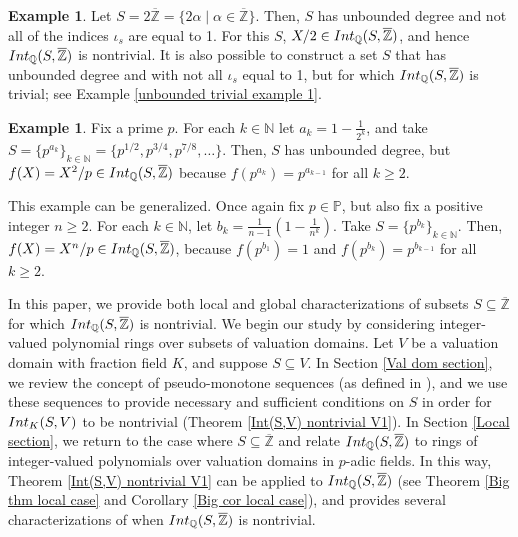 \documentclass{article}
\theoremstyle{definition}\newtheorem{Def}[equation]{Definition}
\newtheorem{Ex}[equation]{Example}
\theoremstyle{definition}\newtheorem{Ques}[equation]{Question}
\theoremstyle{definition}\newtheorem{Conj}[equation]{Conjecture}
\theoremstyle{definition}\newtheorem{Not}[equation]{Notation}
\newcommand{\N}{\mathbb{N}}
\newcommand{\Q}{\mathbb{Q}}
\newcommand{\oZ}{\overline{\Z}}
\newcommand{\Z}{\mathbb{Z}}
\newcommand{\Int}{\textnormal{Int}}
\newcommand{\IntQ}{\Int_{\Q}}
\newcommand{\PP}{\mathbb{P}}
\numberwithin{equation}{section}
\begin{document}
\begin{Ex}\label{2Z example}
Let $S = 2\oZ = \{2\alpha \mid \alpha \in \oZ\}$. Then, $S$ has unbounded degree and not all of the indices $\iota_s$ are equal to 1. For this $S$, $X/2 \in \IntQ(S,\oZ)$, and hence $\IntQ(S,\oZ)$ is nontrivial. It is also possible to construct a set $S$ that has unbounded degree and with not all $\iota_s$ equal to 1, but for which $\IntQ(S,\oZ)$ is trivial; see Example \ref{unbounded trivial example 1}.
\end{Ex}

\begin{Ex}\label{nth roots of p example} Fix a prime $p$. For each $k \in \N$ let $a_k = 1 - \tfrac{1}{2^k}$, and take $S = \{p^{a_k}\}_{k \in \N} = \{p^{1/2}, p^{3/4}, p^{7/8}, \ldots\}$. Then, $S$ has unbounded degree, but $f(X) = X^2/p \in \IntQ(S,\oZ)$ because $f(p^{a_k}) = p^{a_{k-1}}$ for all $k \geq 2$.

This example can be generalized. Once again fix $p \in \PP$, but also fix a positive integer $n \geq 2$. For each $k \in \N$, let $b_k = \frac{1}{n-1}(1 - \frac{1}{n^k})$. Take $S = \{p^{b_k}\}_{k \in \N}$. Then, $f(X) = X^n/p \in \IntQ(S,\oZ)$, because $f(p^{b_1}) = 1$ and $f(p^{b_k}) = p^{b_{k-1}}$ for all $k \geq 2$.
\end{Ex}


In this paper, we provide both local and global characterizations of subsets $S \subseteq \oZ$ for which $\IntQ(S,\oZ)$ is nontrivial. We begin our study by considering integer-valued polynomial rings over subsets of valuation domains. Let $V$ be a valuation domain with fraction field $K$, and suppose $S \subseteq V$. In Section \ref{Val dom section}, we review the concept of pseudo-monotone sequences (as defined in \cite{ChabPolCloVal}), and we use these sequences to provide necessary and sufficient conditions on $S$ in order for $\Int_K(S,V)$ to be nontrivial (Theorem \ref{Int(S,V) nontrivial V1}). In Section \ref{Local section}, we return to the case where $S \subseteq \oZ$ and relate $\IntQ(S,\oZ)$ to rings of integer-valued polynomials over valuation domains in $p$-adic fields. In this way, Theorem \ref{Int(S,V) nontrivial V1} can be applied to $\IntQ(S,\oZ)$ (see Theorem \ref{Big thm local case} and Corollary \ref{Big cor local case}), and provides several characterizations of when $\IntQ(S,\oZ)$ is nontrivial.
\end{document}
